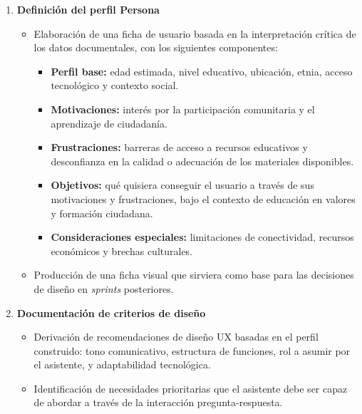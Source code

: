 \begin{enumerate}
      \item \textbf{Definición del perfil Persona}
            \begin{itemize}
                  \item Elaboración de una ficha de usuario basada en la interpretación crítica de los
                        datos documentales, con los siguientes componentes:
                        \begin{itemize}
                              \item \textbf{Perfil base:} edad estimada, nivel educativo, ubicación, etnia, acceso tecnológico y contexto social.
                              \item \textbf{Motivaciones:} interés por la participación comunitaria y el aprendizaje de ciudadanía.
                              \item \textbf{Frustraciones:} barreras de acceso a recursos educativos y desconfianza en la calidad o adecuación de los materiales disponibles.
                              \item \textbf{Objetivos:} qué quisiera conseguir el usuario a través de sus motivaciones y frustraciones, bajo el contexto de educación en valores y formación ciudadana.
                              \item \textbf{Consideraciones especiales:} limitaciones de conectividad, recursos económicos y brechas culturales.
                        \end{itemize}
                  \item Producción de una ficha visual que sirviera como base para las decisiones de
                        diseño en \textit{sprints} posteriores.
            \end{itemize}

      \item \textbf{Documentación de criterios de diseño}
            \begin{itemize}
                  \item Derivación de recomendaciones de diseño UX basadas en el perfil construido:
                        tono comunicativo, estructura de funciones, rol a asumir por el asistente, y
                        adaptabilidad tecnológica.
                  \item Identificación de necesidades prioritarias que el asistente debe ser capaz de
                        abordar a través de la interacción pregunta-respuesta.
            \end{itemize}

\end{enumerate}

